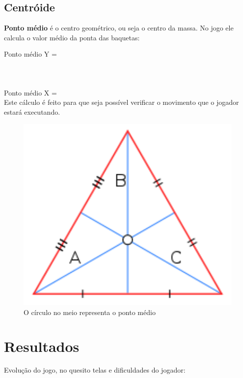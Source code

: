 \documentclass{sciposter}
\begin{document}
\begin{multicols}{3}
\subsection{Centróide}

\textbf{Ponto médio} é o centro geométrico, ou seja o centro da massa. No jogo ele calcula o valor médio da ponta das baquetas:

Ponto médio Y =  \\	

\\\\\\

Ponto médio X = 
 \\

Este cálculo é feito para que seja possível verificar o movimento que o jogador estará executando.

\begin{figure}[!htb]
\centering
\includegraphics[width=15cm]{triangulo_cent.png}
\caption{O círculo no meio representa o ponto médio}
\end{figure}

\section{Resultados }

Evolução do jogo, no quesito telas e dificuldades do jogador: \\


\end{multicols}
\end{document}
